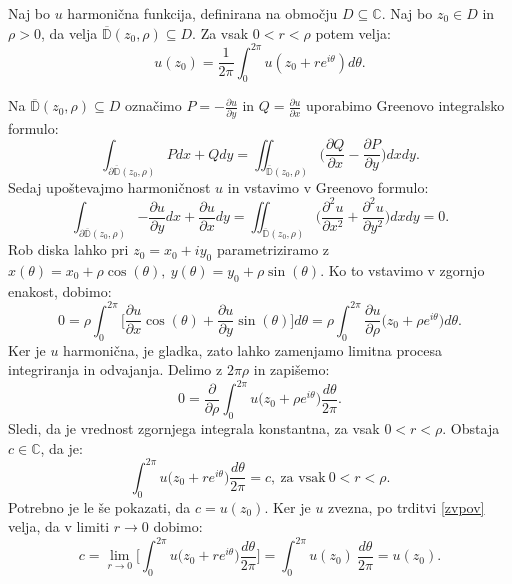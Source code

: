 \documentclass[mat1]{fmfdelo}
\newcommand{\C}{\mathbb C}
\begin{document}
    \begin{trditev}
        \label{harmonicnapovp}
        Naj bo $u$ harmonična funkcija, definirana na območju $D \subseteq \C$. Naj bo $z_0 \in D$ in $\rho > 0$, da velja $\overline{\mathbb{D}}(z_0, \rho) \subseteq D$. Za vsak $0 < r < \rho$ potem velja:
            $$
                u(z_0) = \frac{1}{2 \pi} \int_{0}^{2 \pi}{u(z_0 + r e^{i \theta}) d\theta}.
            $$
    \end{trditev}
    \begin{dokaz}
        Na $\overline{\mathbb{D}}(z_0, \rho) \subseteq D$ označimo $P = -\frac{\partial u}{\partial y}$ in $Q = \frac{\partial u}{\partial x}$ uporabimo Greenovo integralsko formulo:
        $$
            \int_{\partial \overline{\mathbb{D}}(z_0, \rho)}{P dx + Q dy} = \iint_{\overline{\mathbb{D}}(z_0, \rho)}{\bigg(\frac{\partial Q}{\partial x} - \frac{\partial P}{\partial y}\bigg)dx dy}.
        $$ 
        Sedaj upoštevajmo harmoničnost $u$ in vstavimo v Greenovo formulo:
        $$
        \int_{\partial \overline{\mathbb{D}}(z_0, \rho)}{-\frac{\partial u}{\partial y} dx + \frac{\partial u}{\partial x} dy} = \iint_{\overline{\mathbb{D}}(z_0, \rho)}{\bigg(\frac{\partial^2 u}{\partial x^2} + \frac{\partial^2 u}{\partial y^2}\bigg)dx dy} = 0. 
        $$
        Rob diska lahko pri $z_0 = x_0 + iy_0$ parametriziramo z $x(\theta) = x_0 + \rho \cos(\theta),~y(\theta) = y_0 + \rho \sin(\theta)$. Ko to vstavimo v zgornjo enakost, dobimo:
        $$
        0 = \rho \int_{0}^{2 \pi}{\bigg[\frac{\partial u}{\partial x} \cos(\theta) + \frac{\partial u}{\partial y} \sin(\theta)\bigg] d\theta} = \rho \int_{0}^{2\pi}{\frac{\partial u}{\partial \rho}\big({z_0 + \rho e^{i\theta}\big)d\theta}}.
        $$
        Ker je $u$ harmonična, je gladka, zato lahko zamenjamo limitna procesa integriranja in odvajanja. Delimo z $2\pi \rho$ in zapišemo:
        $$
        0 = \frac{\partial}{\partial \rho} \int_{0}^{2\pi}{u\big({z_0 + \rho e^{i\theta}\big)\frac{d\theta}{2 \pi}}}.
        $$
        Sledi, da je vrednost zgornjega integrala konstantna, za vsak $0 <r < \rho$. Obstaja $c \in \mathbb{C}$, da je: 
        $$
        \int_{0}^{2\pi}{u\big({z_0 + r e^{i\theta}\big)\frac{d\theta}{2 \pi}}} = c,~\text{za vsak}~ 0 < r < \rho.
        $$
        Potrebno je le še pokazati, da $c = u(z_0)$.
        Ker je $u$ zvezna, po trditvi \ref{zvpov} velja, da v limiti $r \to 0$ dobimo:
        $$
        c = \lim_{r \to 0}{\bigg[\int_{0}^{2\pi}{u\big({z_0 + r e^{i\theta}\big)\frac{d\theta}{2 \pi}}}\bigg]} = \int_{0}^{2\pi}{{u(z_0)~\frac{d\theta}{2 \pi}}} = u(z_0).
        $$
    \end{dokaz}
\end{document}
